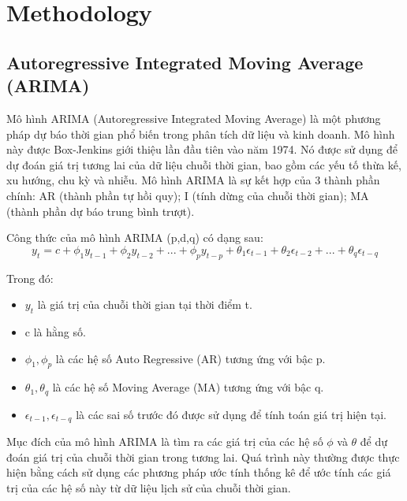 \documentclass{ieeeojies}
\begin{document}
\section{Methodology}
\subsection{Autoregressive Integrated Moving Average (ARIMA)}
Mô hình ARIMA (Autoregressive Integrated Moving Average) là một phương pháp dự báo thời gian phổ biến trong phân tích dữ liệu và kinh doanh. Mô hình này được Box-Jenkins giới thiệu lần đầu tiên vào năm 1974. Nó được sử dụng để dự đoán giá trị tương lai của dữ liệu chuỗi thời gian, bao gồm các yếu tố thừa kế, xu hướng, chu kỳ và nhiễu.
Mô hình ARIMA là sự kết hợp của 3 thành phần chính: AR (thành phần tự hồi quy); I (tính dừng của chuỗi thời gian); MA (thành phần dự báo trung bình trượt).

Công thức của mô hình ARIMA (p,d,q) có dạng sau:
\begin{equation}
y_{t} = c + \phi_{1}y_{t-1} + \phi_{2}y_{t-2} + ... + \phi_{p}y_{t-p} + \theta_{1}\epsilon_{t-1} + \theta_{2}\epsilon_{t-2} + ... + \theta_{q}\epsilon_{t-q}    
\end{equation}

Trong đó:
\begin{itemize}
    \item \(y_{t}\) là giá trị của chuỗi thời gian tại thời điểm t.
    \item c là hằng số.
    \item \(\phi_{1}, \phi_{p}\) là các hệ số Auto Regressive (AR) tương ứng với bậc p.
    \item \(\theta_{1}, \theta_{q}\) là các hệ số Moving Average (MA) tương ứng với bậc q.
    \item \(\epsilon_{t-1}, \epsilon_{t-q}\) là các sai số trước đó được sử dụng để tính toán giá trị hiện tại.
\end{itemize}

Mục đích của mô hình ARIMA là tìm ra các giá trị của các hệ số \(\phi\) và \(\theta\) để dự đoán giá trị của chuỗi thời gian trong tương lai. Quá trình này thường được thực hiện bằng cách sử dụng các phương pháp ước tính thống kê để ước tính các giá trị của các hệ số này từ dữ liệu lịch sử của chuỗi thời gian.
\end{document}
